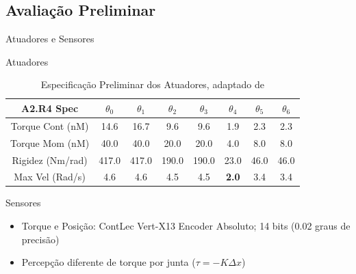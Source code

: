 \documentclass{beamer}
\begin{document}
\subsection{Avaliação Preliminar}
\begin{frame}{Atuadores e Sensores}
\begin{block}{Atuadores}
    \begin{table}[H]
    \centering
    \tiny
    \caption{Especificação Preliminar dos Atuadores, adaptado de \cite{mekaguide}}
    \begin{tabular}{c|ccccccc}
         \hline
         A2.R4 Spec & $\theta_0$ & $\theta_1$ & $\theta_2$ & $\theta_3$ & $\theta_4$ & $\theta_5$ & $\theta_6$\\
         \hline
         Torque Cont  (nM)     & 14.6   & 16.7   & 9.6    & 9.6    & 1.9    & 2.3   & 2.3 \\
         Torque Mom (nM)      & 40.0   & 40.0   & 20.0   & 20.0   & 4.0    & 8.0   & 8.0 \\
         Rigidez (Nm/rad)     & 417.0  & 417.0  & 190.0  & 190.0  & 23.0   & 46.0  & 46.0 \\
         Max Vel (Rad/s)      & 4.6    & 4.6    & 4.5    & 4.5    & \textbf{\color{blue}2.0}   & 3.4   & 3.4 \\
         \hline
    \end{tabular}
    \label{tab:a2armActuationDoc}
\end{table}
\end{block}
\begin{block}{Sensores}
\begin{itemize}
    \item Torque e Posição: ContLec Vert-X13 Encoder Absoluto; 14 bits (0.02 graus de precisão)
    \item Percepção diferente de torque por junta ($\tau = -K\Delta x $)
\end{itemize}
\end{block}
\end{frame}
\end{document}
